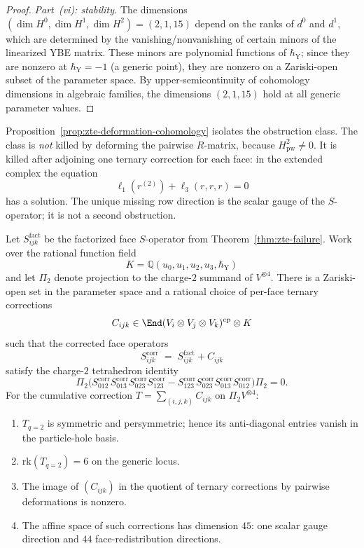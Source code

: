 \begin{proof}
\smallskip\noindent\emph{Part~(vi): stability.} The dimensions $(\dim H^0, \dim H^1, \dim H^2) = (2, 1, 15)$ depend on the ranks of $d^0$ and $d^1$, which are determined by the vanishing/nonvanishing of certain minors of the linearized YBE matrix. These minors are polynomial functions of $\hbar_{\mathrm{Y}}$; since they are nonzero at $\hbar_{\mathrm{Y}} = -1$ (a generic point), they are nonzero on a Zariski-open subset of the parameter space. By upper-semicontinuity of cohomology dimensions in algebraic families, the dimensions $(2, 1, 15)$ hold at all generic parameter values.
\end{proof}

\begin{remark}
\label{rem:zte-gauge-extended}
Proposition~\ref{prop:zte-deformation-cohomology} isolates the obstruction class. The class is \emph{not} killed by deforming the pairwise $R$-matrix, because $H^2_{\mathrm{pw}} \neq 0$. It is killed after adjoining one ternary correction for each face: in the extended complex the equation
\[
 \ell_1(r^{(2)})+\ell_3(r,r,r)=0
\]
has a solution. The unique missing row direction is the scalar gauge of the $S$-operator; it is not a second obstruction.
\end{remark}

\begin{proposition}
\label{prop:zte-explicit-correction}
Let $S^{\mathrm{fact}}_{ijk}$ be the factorized face $S$-operator from Theorem~\ref{thm:zte-failure}. Work over the rational function field
\[
 K=\mathbb Q(u_0,u_1,u_2,u_3,\hbar_{\mathrm Y})
\]
and let $\Pi_2$ denote projection to the charge-$2$ summand of $V^{\otimes4}$. There is a Zariski-open set in the parameter space and a rational choice of per-face ternary corrections
\[
 C_{ijk}\in\End(V_i\otimes V_j\otimes V_k)^{\mathrm{cp}}\otimes K
\]
such that the corrected face operators
\[
 S^{\mathrm{corr}}_{ijk} \;=\; S^{\mathrm{fact}}_{ijk} + C_{ijk}
\]
satisfy the charge-$2$ tetrahedron identity
\[
\Pi_2\bigl(
S^{\mathrm{corr}}_{012}S^{\mathrm{corr}}_{013}
S^{\mathrm{corr}}_{023}S^{\mathrm{corr}}_{123}
-
S^{\mathrm{corr}}_{123}S^{\mathrm{corr}}_{023}
S^{\mathrm{corr}}_{013}S^{\mathrm{corr}}_{012}
\bigr)\Pi_2=0.
\]
For the cumulative correction $T=\sum_{(i,j,k)}C_{ijk}$ on
$\Pi_2V^{\otimes4}$:
\begin{enumerate}[label=\textup{(\roman*)}]
 \item $T_{q=2}$ is symmetric and persymmetric; hence its anti-diagonal entries vanish in the particle-hole basis.
 \item $\mathrm{rk}(T_{q=2})=6$ on the generic locus.
 \item The image of $(C_{ijk})$ in the quotient of ternary corrections by pairwise deformations is nonzero.
 \item The affine space of such corrections has dimension $45$: one scalar gauge direction and $44$ face-redistribution directions.
\end{enumerate}
\end{proposition}

